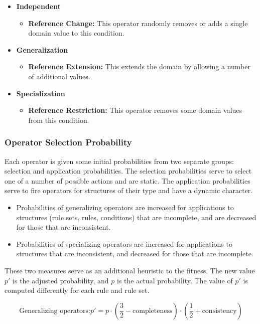 \documentclass[../main.tex]{subfiles}
\begin{document}
\begin{itemize}
	\item \textbf{Independent}
	\begin{itemize}
		\item \textbf{Reference Change:} This operator randomly removes or adds a single domain value to this
		condition.
	\end{itemize}
	\item \textbf{Generalization}
		\begin{itemize}
		\item \textbf{Reference Extension:} This extends the domain by allowing a number of additional values.
	\end{itemize}
	\item \textbf{Specialization}
	\begin{itemize}
		\item \textbf{Reference Restriction:} This operator removes some domain values from this condition.
	\end{itemize}
\end{itemize}

\subsubsection{Operator Selection Probability}
Each operator is given some initial probabilities from two separate groups: selection and application probabilities.
The selection probabilities serve to select one of a number of possible actions and are static. The application
probabilities serve to fire operators for structures of their type and have a dynamic character.

\begin{itemize}
	\item Probabilities of generalizing operators are increased for applications to structures (rule sets, rules,
	conditions) that are incomplete, and are decreased for those that are inconsistent.
	\item Probabilities of specializing operators are increased for applications to structures that are inconsistent,
	and decreased for those that are incomplete.
\end{itemize}

These two measures serve as an additional heuristic to the fitness. The new value $p'$ is the adjusted probability,
and $p$ is the actual probability. The value of $p'$ is computed differently for each rule and rule set.

\begin{equation}
	\text{Generalizing operators:} p' = p \cdot \left( \frac{3}{2} - \text{completeness} \right) \cdot \left(
	\frac{1}{2} + \text{consistency} \right)
\end{equation}
\end{document}
